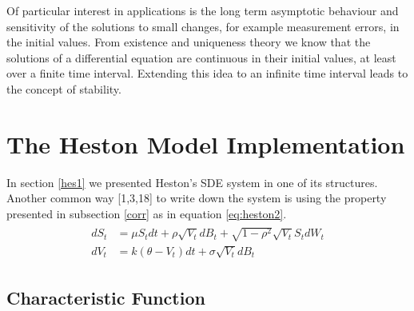 \documentclass[12pt,twoside]{reedthesis}
\theoremstyle{definition}
\theoremstyle{definition}
\theoremstyle{remark}
\begin{document}
  Of particular interest in applications is the long term asymptotic
  behaviour and sensitivity of the solutions to small changes, for example
  measurement errors, in the initial values. From existence and uniqueness
  theory we know that the solutions of a differential equation are
  continuous in their initial values, at least over a finite time
  interval. Extending this idea to an infinite time interval leads to the
  concept of stability.
  
  \chapter{The Heston Model
  Implementation}\label{the-heston-model-implementation}
  
  In section \ref{hes1} we presented Heston's SDE system in one of its
  structures. Another common way {[}1,3,18{]} to write down the system is
  using the property presented in subsection \ref{corr} as in equation
  \eqref{eq:heston2}.
  \begin{align}
  \label{eq:heston2}
  \begin{split}
  dS_t &= \mu S_t dt + \rho \sqrt{V_t} dB_t + \sqrt{1 - \rho^2} \sqrt{V_t} S_t dW_t \\
  dV_t &= k(\theta - V_t)dt + \sigma \sqrt{V_t} dB_t 
  \end{split}
  \end{align}
  \section{Characteristic Function}\label{characteristic-function}
  
\end{document}
